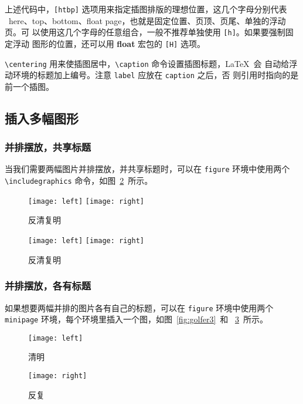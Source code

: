 上述代码中，\verb|[htbp]| 选项用来指定插图排版的理想位置，这几个字母分别代表
~here、top、bottom、float page，也就是固定位置、页顶、页尾、单独的浮动页。可
以使用这几个字母的任意组合，一般不推荐单独使用 \verb|[h]|。如果要强制固定浮动
图形的位置，还可以用 \textbf{float} 宏包的 \verb|[H]| 选项。

\verb|\centering| 用来使插图居中，\verb|\caption| 命令设置插图标题，\LaTeX~会
自动给浮动环境的标题加上编号。注意 \verb|label| 应放在 \verb|caption| 之后，否
则引用时指向的是前一个插图。

\subsection{插入多幅图形}

\subsubsection*{并排摆放，共享标题}

当我们需要两幅图片并排摆放，并共享标题时，可以在 \texttt{figure} 环境中使用两个
\verb|\includegraphics| 命令，如图~\ref{fig:golfer2}~所示。

\begin{code}
\begin{figure}[htbp]
\centering
\texttt{[image: left]}
\hspace{36pt}
\texttt{[image: right]}
\caption{反清复明}
\label{fig:golfer2}
\end{figure}
\end{code}

\begin{figure}[htbp]
\centering
\texttt{[image: left]}
\hspace{36pt}
\texttt{[image: right]}
\caption{反清复明}
\label{fig:golfer2}
\end{figure}

\subsubsection*{并排摆放，各有标题}

如果想要两幅并排的图片各有自己的标题，可以在 \texttt{figure} 环境中使用两个
 \texttt{minipage} 环境，每个环境里插入一个图，如图~\ref{fig:golfer3}~和
~\ref{fig:golfer4}~所示。

\begin{code}
\begin{figure}[htbp]
\centering
\begin{minipage}[t]{0.3\textwidth}
    \centering
    \texttt{[image: left]}
    \caption{清明}
    \label{fig:golfer3}
\end{minipage}
\hspace{36pt}
\begin{minipage}[t]{0.3\textwidth}
    \centering
    \texttt{[image: right]}
    \caption{反复}
    \label{fig:golfer4}
\end{minipage}
\end{figure}
\end{code}

